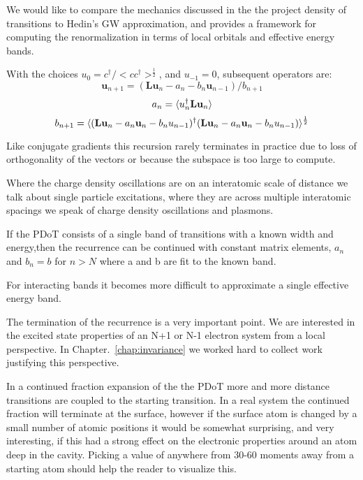 We would like to compare the mechanics discussed in the the project density of transitions
to Hedin's GW approximation, and provides a framework for computing the renormalization 
in terms of local orbitals and effective energy bands.

With the choices $u_{0}=c^{\dagger}/<c c^{\dagger}>^{\frac{1}{2}}$, and $u_{-1}=0$,
subsequent operators are:
%
\begin{equation}
\label{eq:pdotvectors}
\mathbf{u}_{n+1} = (\mathbf{L} \mathbf{u}_{n} - a_{n}-b_{n}\mathbf{u}_{n-1})/b_{n+1}
\end{equation}
%
\begin{equation}
a_{n} = \langle u^{\dagger}_{n} \mathbf{L} \mathbf{u}_{n} \rangle
\end{equation}
%
\begin{equation}
b_{n+1} = \langle 
(\mathbf{L} \mathbf{u}_{n} - a_{n} \mathbf{u}_{n} - b_{n}u_{n-1})^{\dagger} 
(\mathbf{L} \mathbf{u}_{n} - a_{n} \mathbf{u}_{n} - b_{n}u_{n-1})
\rangle^{\frac{1}{2}}
\end{equation}
%

Like conjugate gradients this recursion rarely terminates in practice 
due to loss of orthogonality of the vectors or because the subspace is 
too large to compute.

Where the charge density oscillations are on an interatomic scale of distance
we talk about single particle excitations, where they are across multiple 
interatomic spacings we speak of charge density oscillations and plasmons.

If the PDoT consists of a single band of transitions with a known width 
and energy,then the recurrence can be continued with constant matrix elements, $a_{n}$ and $b_{n}=b$
for $n>N$ where a and b are fit to the known band. 

For interacting bands it becomes more difficult to approximate a 
single effective energy band.

The termination of the recurrence is a very important point. 
We are interested in the excited state properties of an N+1 or N-1 electron system
from a local perspective. In Chapter.~\ref{chap:invariance} we worked hard to collect work
justifying this perspective. 

In a continued fraction expansion of the the PDoT more and more distance transitions are coupled
to the starting transition. In a real system the continued fraction will terminate at the surface,
however if the surface atom is changed by a small number of atomic positions it would
be somewhat surprising, and very interesting, if this had a strong effect on the electronic
properties around an atom deep in the cavity. Picking a value of anywhere from 30-60 moments 
away from a starting atom should help the reader to visualize this.

